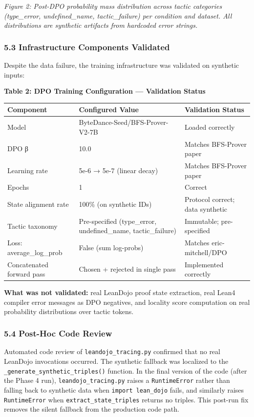 \textit{Figure 2: Post-DPO probability mass distribution across tactic categories (type_error, undefined_name, tactic_failure) per condition and dataset. All distributions are synthetic artifacts from hardcoded error strings.}

\subsubsection{5.3 Infrastructure Components Validated}

Despite the data failure, the training infrastructure was validated on synthetic inputs:

\textbf{Table 2: DPO Training Configuration — Validation Status}

\begin{table}[htbp]
\centering
\begin{tabular}{lll}
\toprule
Component & Configured Value & Validation Status \\
\midrule
Model & ByteDance-Seed/BFS-Prover-V2-7B & Loaded correctly \\
DPO β & 10.0 & Matches BFS-Prover paper \\
Learning rate & 5e-6 → 5e-7 (linear decay) & Matches BFS-Prover paper \\
Epochs & 1 & Correct \\
State alignment rate & 100\% (on synthetic IDs) & Protocol correct; data synthetic \\
Tactic taxonomy & Pre-specified (type_error, undefined_name, tactic_failure) & Immutable; pre-specified \\
Loss: average_log_prob & False (sum log-probs) & Matches eric-mitchell/DPO \\
Concatenated forward pass & Chosen + rejected in single pass & Implemented correctly \\
\bottomrule
\end{tabular}
\end{table}

\textbf{What was not validated:} real LeanDojo proof state extraction, real Lean4 compiler error messages as DPO negatives, and locality score computation on real probability distributions over tactic tokens.

\subsubsection{5.4 Post-Hoc Code Review}

Automated code review of \texttt{leandojo_tracing.py} confirmed that no real LeanDojo invocations occurred. The synthetic fallback was localized to the \texttt{_generate_synthetic_triples()} function. In the final version of the code (after the Phase 4 run), \texttt{leandojo_tracing.py} raises a \texttt{RuntimeError} rather than falling back to synthetic data when \texttt{import lean_dojo} fails, and similarly raises \texttt{RuntimeError} when \texttt{extract_state_triples} returns no triples. This post-run fix removes the silent fallback from the production code path.


